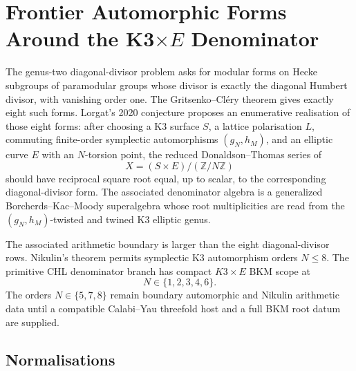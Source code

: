 \providecommand{\kBKM}{\kappa_{\mathrm{BKM}}}
\providecommand{\kch}{\kappa_{\mathrm{ch}}}
\providecommand{\kcat}{\kappa_{\mathrm{cat}}}
\providecommand{\kfib}{\kappa_{\mathrm{fiber}}}
\providecommand{\kHeis}{\kappa_{\mathrm{ch}}^{\mathrm{Heis}}}
\providecommand{\Sp}{\mathrm{Sp}}
\providecommand{\OO}{\mathrm{O}}
\providecommand{\HH}{\mathbb{H}}
\providecommand{\fg}{\mathfrak{g}}
\providecommand{\cO}{\mathcal{O}}
\providecommand{\DT}{\mathrm{DT}}
\providecommand{\wt}{\mathrm{wt}}
\providecommand{\Jac}{\mathrm{Jac}}
\providecommand{\Z}{\mathbb{Z}}
\providecommand{\bC}{\mathbb{C}}
\providecommand{\bP}{\mathbb{P}}

\section*{Frontier Automorphic Forms Around the K3$\times E$ Denominator}
\label{sec:frontier-forms-standalone}

The genus-two diagonal-divisor problem asks for modular forms on
Hecke subgroups of paramodular groups whose divisor is exactly the
diagonal Humbert divisor, with vanishing order one.  The
Gritsenko--Cl\'ery theorem gives exactly eight such forms.  Lorgat's
2020 conjecture proposes an enumerative realisation of those eight
forms: after choosing a K3 surface \(S\), a lattice polarisation \(L\),
commuting finite-order symplectic automorphisms \((g_N,h_M)\), and an
elliptic curve \(E\) with an \(N\)-torsion point, the reduced
Donaldson--Thomas series of
\[
        X=(S\times E)/(\Z/N\Z)
\]
should have reciprocal square root equal, up to scalar, to the
corresponding diagonal-divisor form.  The associated denominator
algebra is a generalized Borcherds--Kac--Moody superalgebra whose
root multiplicities are read from the \((g_N,h_M)\)-twisted and twined
K3 elliptic genus.

The associated arithmetic boundary is larger than the eight
diagonal-divisor rows.  Nikulin's theorem permits
symplectic K3 automorphism orders \(N\leq 8\).  The primitive CHL
denominator branch has compact \(K3\times E\) BKM scope at
\[
        N\in\{1,2,3,4,6\}.
\]
The orders \(N\in\{5,7,8\}\) remain boundary automorphic and Nikulin
arithmetic data until a compatible Calabi--Yau threefold host and
a full BKM root datum are supplied.

\subsection*{Normalisations}
\label{sec:frontier-normalisations}

